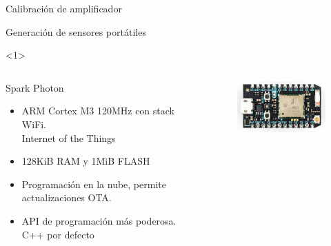 \begin{frame}{Calibración de amplificador}


\end{frame}

\begin{frame}{Generación de sensores portátiles}
\begin{onlyenv}<1>
    \begin{columns}[c]
        \begin{column}{.5\textwidth}
        Spark Photon
        \begin{itemize}
        \item ARM Cortex M3 120MHz con stack WiFi. \\Internet of the Things
        \item 128KiB RAM y 1MiB FLASH
        \item Programación en la nube, permite actualizaciones OTA.
        \item API de programación más poderosa. C++ por defecto
        \end{itemize}
        \end{column}

        \begin{column}{.3\textwidth}
            \begin{figure}
                \centering
                \includegraphics[width=\textwidth]{fig/circuito/photon}
                \label{fig:circuito/photon}
            \end{figure}
        \end{column}
    \end{columns}
\end{onlyenv}


\end{frame}
